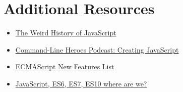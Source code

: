 \section{Additional Resources}

\begin{itemize}[leftmargin=*]
    \item \href{https://javascriptweekly.com/link/66136/f8cbfdb908}{The Weird History of JavaScript}
    \item \href{https://www.redhat.com/en/command-line-heroes/season-3/creating-javascript}{Command-Line Heroes Podcast: Creating JavaScript}
    \item \href{https://github.com/daumann/ECMAScript-new-features-list}{ECMAScript New Features List}
    \item \href{https://medium.com/engineered-publicis-sapient/javascript-es6-es7-es10-where-are-we-8ac044dfd964}{JavaScript, ES6, ES7, ES10 where are we?}
\end{itemize}
